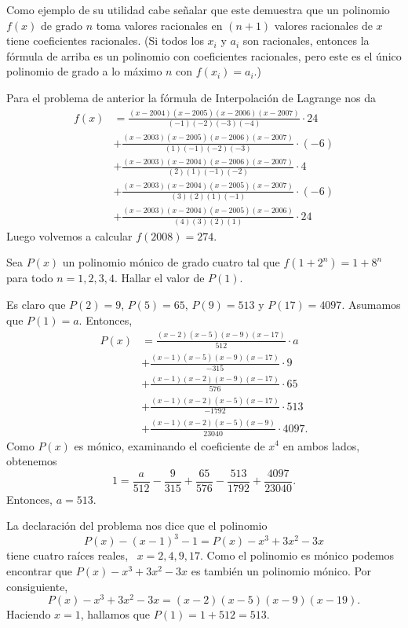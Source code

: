 Como ejemplo de su utilidad cabe señalar que este demuestra que un polinomio $f(x)$ de grado $n$ toma valores racionales en $(n + 1)$ valores racionales de $x$ tiene coeficientes racionales.
(Si todos los $x_i$ y $a_i$ son racionales, entonces la fórmula de arriba es un polinomio con coeficientes racionales, pero este es el único polinomio de grado a lo máximo $n$ con $f(x_i) = a_i$.)

Para el problema de anterior la fórmula de Interpolación de Lagrange nos da
\begin{align*}
    f(x) &= \frac{(x - 2004)(x - 2005)(x - 2006)(x - 2007)}{(-1)(-2)(-3)(-4)} \cdot 24\\[1mm]
    &+ \frac{(x - 2003)(x - 2005)(x - 2006)(x - 2007)}{(1)(-1)(-2)(-3)} \cdot (-6)\\[1mm]
    &+ \frac{(x - 2003)(x - 2004)(x - 2006)(x - 2007)}{(2)(1)(-1)(-2)} \cdot 4\\[1mm]
    &+ \frac{(x - 2003)(x - 2004)(x - 2005)(x - 2007)}{(3)(2)(1)(-1)} \cdot (-6)\\[1mm]
    &+ \frac{(x - 2003)(x - 2004)(x - 2005)(x - 2006)}{(4)(3)(2)(1)} \cdot 24
\end{align*}
Luego volvemos a calcular $f(2008) = 274$.

\begin{example}
    Sea $P(x)$ un polinomio mónico de grado cuatro tal que $f(1 + 2^n) = 1 + 8^n$ para todo $n = 1, 2, 3, 4$.
    Hallar el valor de $P(1)$.
\end{example}
\begin{solution}[1]
    Es claro que $P(2) = 9$, $P(5) = 65$, $P(9) = 513$ y $P(17) = 4097$.
    Asumamos que $P(1) = a$.
    Entonces,
    \begin{align*}
        P(x) &= \frac{(x - 2)(x - 5)(x - 9)(x - 17)}{512} \cdot a\\[1mm]
        &+ \frac{(x - 1)(x - 5)(x - 9)(x - 17)}{-315} \cdot 9\\[1mm]
        &+ \frac{(x - 1)(x - 2)(x - 9)(x - 17)}{576} \cdot 65\\[1mm]
        &+ \frac{(x - 1)(x - 2)(x - 5)(x - 17)}{-1792} \cdot 513\\[1mm]
        &+ \frac{(x - 1)(x - 2)(x - 5)(x - 9)}{23040} \cdot 4097.
    \end{align*}
    Como $P(x)$ es mónico, examinando el coeficiente de $x^4$ en ambos lados, obtenemos
    \[
        1 = \frac{a}{512} - \frac{9}{315} + \frac{65}{576} - \frac{513}{1792} + \frac{4097}{23040}.
    \]
    Entonces, $a = 513$.
\end{solution}
\begin{solution}[2]
    La declaración del problema nos dice que el polinomio
    \[
        P(x) - (x - 1)^3 - 1 = P(x) - x^3 + 3x^2 - 3x
    \]
    tiene cuatro raíces reales, \ie\ $x = 2, 4, 9, 17$.
    Como el polinomio es mónico podemos encontrar que $P(x) - x^3 + 3x^2 - 3x$ es también un polinomio mónico.
    Por consiguiente,
    \[
        P(x) - x^3 + 3x^2 - 3x = (x - 2)(x - 5)(x - 9)(x - 19).
    \]
    Haciendo $x = 1$, hallamos que $P(1) = 1 + 512 = 513$.
\end{solution}

